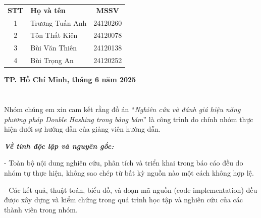 \documentclass[12pt,a4paper]{report}
\begin{document}
\begin{center}
{\begin{minipage}{0.95\textwidth}
\begin{center}
                \renewcommand{\arraystretch}{1.2}
                \begin{tabular}{ c  l  c }
                
                    \textbf{STT} & \textbf{Họ và tên} & \textbf{MSSV} \\
                    
                    1 & Trương Tuấn Anh & 24120260 \\
                    2 & Tôn Thất Kiên & 24120078 \\
                    3 & Bùi Văn Thiên & 24120138 \\
                    4 & Bùi Trọng An & 24120252 \\
                
                \end{tabular}
                
                \vspace{11em}
                \textbf{TP. Hồ Chí Minh, tháng 6 năm 2025}
                \\[3em]
                \textbf{ }
            \end{center}
        \end{minipage}
    }
\end{center}

\newpage
{}
\setcounter{page}{1}

\chapter*{}

\setlength{\parindent}{2em}   %
\setlength{\parskip}{0.5em}     %

\noindent \indent Nhóm chúng em xin cam kết rằng đồ án “\textit{Nghiên cứu và đánh giá hiệu năng phương pháp Double Hashing trong bảng băm}” là công trình do chính nhóm thực hiện dưới sự hướng dẫn của giảng viên hướng dẫn.

\textbf{\textit{Về tính độc lập và nguyên gốc:}}

- Toàn bộ nội dung nghiên cứu, phân tích và triển khai trong báo cáo đều do nhóm tự thực hiện, không sao chép từ bất kỳ nguồn nào một cách không hợp lệ.

- Các kết quả, thuật toán, biểu đồ, và đoạn mã nguồn (code implementation) đều được xây dựng và kiểm chứng trong quá trình học tập và nghiên cứu của các thành viên trong nhóm.
\end{document}
